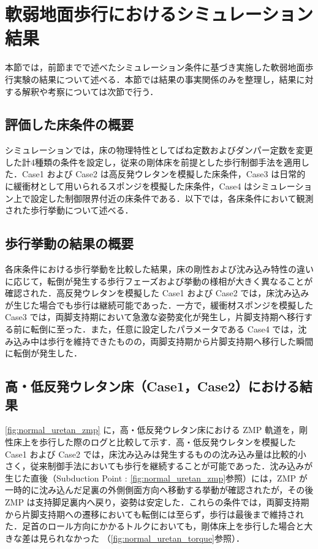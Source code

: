 \section{軟弱地面歩行におけるシミュレーション結果}
\label{sec:sim_results}

本節では，前節までで述べたシミュレーション条件に基づき実施した軟弱地面歩行実験の結果について述べる．本節では結果の事実関係のみを整理し，結果に対する解釈や考察については次節で行う．

\subsection{評価した床条件の概要}
\label{subsec:sim_result_conditions}

シミュレーションでは，床の物理特性としてばね定数およびダンパー定数を変更した計4種類の条件を設定し，従来の剛体床を前提とした歩行制御手法を適用した．Case1 および Case2 は高反発ウレタンを模擬した床条件，Case3 は日常的に緩衝材として用いられるスポンジを模擬した床条件，Case4 はシミュレーション上で設定した制御限界付近の床条件である．以下では，各床条件において観測された歩行挙動について述べる．

\subsection{歩行挙動の結果の概要}
\label{subsec:sim_result_overview}

各床条件における歩行挙動を比較した結果，床の剛性および沈み込み特性の違いに応じて，転倒が発生する歩行フェーズおよび挙動の様相が大きく異なることが確認された．高反発ウレタンを模擬した Case1 および Case2 では，床沈み込みが生じた場合でも歩行は継続可能であった．一方で，緩衝材スポンジを模擬した Case3 では，両脚支持期において急激な姿勢変化が発生し，片脚支持期へ移行する前に転倒に至った．また，任意に設定したパラメータである Case4 では，沈み込み中は歩行を維持できたものの，両脚支持期から片脚支持期へ移行した瞬間に転倒が発生した．

\subsection{高・低反発ウレタン床（Case1，Case2）における結果}
\label{subsec:sim_result_urethane}

\cref{fig:normal_uretan_zmp} に，高・低反発ウレタン床における ZMP 軌道を，剛性床上を歩行した際のログと比較して示す．高・低反発ウレタンを模擬した Case1 および Case2 では，床沈み込みは発生するものの沈み込み量は比較的小さく，従来制御手法においても歩行を継続することが可能であった．沈み込みが生じた直後（Subduction Point : \cref{fig:normal_uretan_zmp}参照）には，ZMP が一時的に沈み込んだ足裏の外側側面方向へ移動する挙動が確認されたが，その後 ZMP は支持脚足裏内へ戻り，姿勢は安定した．これらの条件では，両脚支持期から片脚支持期への遷移においても転倒には至らず，歩行は最後まで維持された．足首のロール方向にかかるトルクにおいても，剛体床上を歩行した場合と大きな差は見られなかった （\cref{fig:normal_uretan_torque}参照）．

